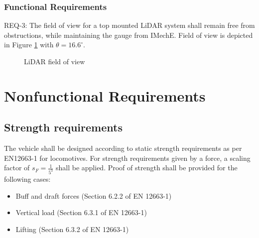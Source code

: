 \documentclass{scrreprt}
\begin{document}
\subsection{Functional Requirements}
REQ-3: The field of view for a top mounted LiDAR system shall remain free from obstructions, while maintaining the gauge from IMechE. Field of view is depicted in Figure \ref{fig:lidar} with $\theta = 16.6^\circ$.
\begin{figure}[htbp]
\begin{center}
\caption{LiDAR field of view}
\label{fig:lidar}
\end{center}
\end{figure}



\chapter{Nonfunctional Requirements}
\section{Strength requirements}
The vehicle shall be designed according to static strength requirements as per EN12663-1 for locomotives. For strength requirements given by a force, a scaling factor of $s_{F} = \frac{1}{5^3}$ shall be applied. Proof of strength shall be provided for the following cases:
\begin{itemize}
		\item Buff and draft forces (Section 6.2.2 of EN 12663-1)
		\item Vertical load (Section 6.3.1 of EN 12663-1)
		\item Lifting (Section 6.3.2 of EN 12663-1)
		\end{itemize}
\end{document}

